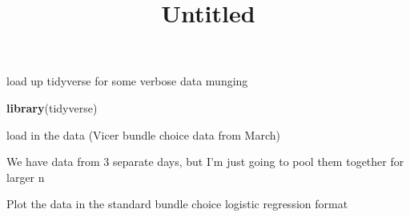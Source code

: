 \documentclass[]{article}
\title{Untitled}
\author{}
\date{}
\newenvironment{Shaded}{\begin{snugshade}}{\end{snugshade}}
\newcommand{\CharTok}[1]{\textcolor[rgb]{0.31,0.60,0.02}{#1}}
\newcommand{\CommentTok}[1]{\textcolor[rgb]{0.56,0.35,0.01}{\textit{#1}}}
\newcommand{\DataTypeTok}[1]{\textcolor[rgb]{0.13,0.29,0.53}{#1}}
\newcommand{\KeywordTok}[1]{\textcolor[rgb]{0.13,0.29,0.53}{\textbf{#1}}}
\newcommand{\NormalTok}[1]{#1}
\newcommand{\OperatorTok}[1]{\textcolor[rgb]{0.81,0.36,0.00}{\textbf{#1}}}
\newcommand{\OtherTok}[1]{\textcolor[rgb]{0.56,0.35,0.01}{#1}}
\newcommand{\StringTok}[1]{\textcolor[rgb]{0.31,0.60,0.02}{#1}}
\begin{document}
\maketitle

load up tidyverse for some verbose data munging

\begin{Shaded}
\begin{Highlighting}[]
\KeywordTok{library}\NormalTok{(tidyverse)}
\end{Highlighting}
\end{Shaded}

load in the data (Vicer bundle choice data from March)

\begin{Shaded}
\end{Shaded}

We have data from 3 separate days, but I'm just going to pool them
together for larger n

Plot the data in the standard bundle choice logistic regression format
\end{document}
